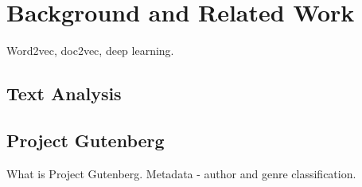 \chapter{Background and Related Work}
Word2vec\cite{word2vec}, doc2vec\cite{doc2vec}, deep learning\cite{Goodfellow}.
\section{Text Analysis}

\section{Project Gutenberg}
What is Project Gutenberg. Metadata - author and genre classification.

